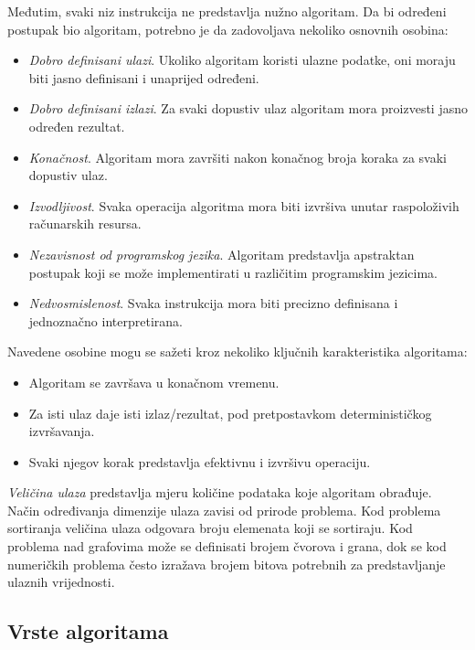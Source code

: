 Međutim, svaki niz instrukcija ne predstavlja nužno algoritam. Da bi određeni postupak bio algoritam, potrebno je da zadovoljava nekoliko osnovnih osobina:

\begin{itemize}
	\item \textit{Dobro definisani ulazi}. Ukoliko algoritam koristi ulazne podatke, oni moraju biti jasno definisani i unaprijed određeni.
	\item \textit{Dobro definisani izlazi}. Za svaki dopustiv ulaz algoritam mora proizvesti jasno određen rezultat.
	\item \textit{Konačnost}. Algoritam mora završiti nakon konačnog broja koraka za svaki dopustiv ulaz.
	\item \textit{Izvodljivost}. Svaka operacija algoritma mora biti izvršiva unutar raspoloživih računarskih resursa.
	\item \textit{Nezavisnost od programskog jezika}. Algoritam predstavlja apstraktan postupak koji se može implementirati u različitim programskim jezicima.
	\item \textit{Nedvosmislenost}. Svaka instrukcija mora biti precizno definisana i jednoznačno interpretirana.
\end{itemize}

Navedene osobine mogu se sažeti kroz nekoliko ključnih karakteristika algoritama:

\begin{itemize}
	\item Algoritam se završava u konačnom vremenu.
	\item Za isti ulaz daje isti izlaz/rezultat, pod pretpostavkom determinističkog izvršavanja.
	\item Svaki njegov korak predstavlja efektivnu i izvršivu operaciju.
\end{itemize}

\textit{Veličina ulaza} predstavlja mjeru količine podataka koje algoritam obra\-đuje. Način određivanja dimenzije ulaza zavisi od prirode problema. Kod problema sortiranja veličina ulaza odgovara broju elemenata koji se sortiraju. Kod problema nad grafovima može se definisati brojem čvorova i grana, dok se kod numeričkih problema često izražava brojem bitova potrebnih za predstavljanje ulaznih vrijednosti.

\subsection{Vrste algoritama}

